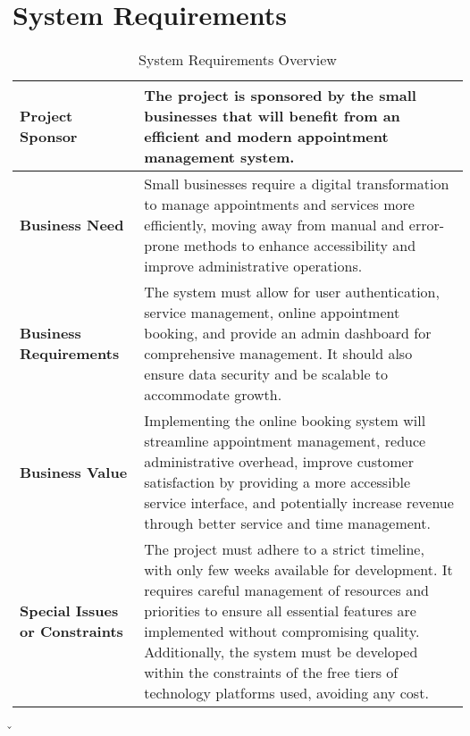 \section{System Requirements}
\label{sec:system-requirements}
    \large
    \begin{table}[H]
        \begin{tabular}{m{}|m{}}
            \textbf{Project Sponsor} & The project is sponsored by the small businesses that will benefit from an efficient and modern appointment management system. \\\hline
            \textbf{Business Need} & Small businesses require a digital transformation to manage appointments and services more efficiently, moving away from manual and error-prone methods to enhance accessibility and improve administrative operations. \\\hline
            \textbf{Business Requirements} & The system must allow for user authentication, service management, online appointment booking, and provide an admin dashboard for comprehensive management. It should also ensure data security and be scalable to accommodate growth. \\\hline
            \textbf{Business Value} & Implementing the online booking system will streamline appointment management, reduce administrative overhead, improve customer satisfaction by providing a more accessible service interface, and potentially increase revenue through better service and time management. \\\hline
            \textbf{Special Issues or Constraints} & The project must adhere to a strict timeline, with only few weeks available for development. It requires careful management of resources and priorities to ensure all essential features are implemented without compromising quality. Additionally, the system must be developed within the constraints of the free tiers of technology platforms used, avoiding any cost.
        \end{tabular}
        ̌\caption{System Requirements Overview}
        \label{tab:system-requirements-overview}
    \end{table}